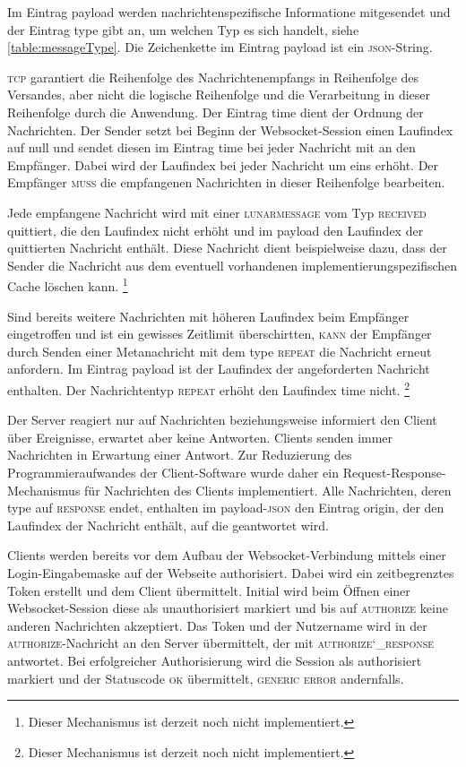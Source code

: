 \documentclass[ngerman,11pt]{report}
\begin{document}
Im Eintrag payload werden nachrichtenspezifische Informatione mitgesendet und der Eintrag
type gibt an, um welchen Typ es sich handelt, siehe \ref{table:messageType}. Die Zeichenkette
im Eintrag payload ist ein \textsc{json}-String.

\textsc{tcp} garantiert die Reihenfolge des Nachrichtenempfangs in Reihenfolge des Versandes,
aber nicht die logische Reihenfolge und die Verarbeitung in dieser Reihenfolge durch die
Anwendung. Der Eintrag time dient der Ordnung der Nachrichten. Der Sender setzt bei Beginn
der Websocket-Session einen Laufindex auf null und sendet diesen im Eintrag time bei jeder
Nachricht mit an den Empfänger. Dabei wird der Laufindex bei jeder Nachricht um eins erhöht.
Der Empfänger \textsc{muss} die empfangenen Nachrichten in dieser Reihenfolge bearbeiten.

Jede empfangene Nachricht wird mit einer \textsc{lunarmessage} vom Typ \textsc{received} quittiert,
die den Laufindex nicht erhöht und im payload den Laufindex der quittierten Nachricht enthält.
Diese Nachricht dient beispielweise dazu, dass der Sender die Nachricht aus dem eventuell vorhandenen
implementierungspezifischen Cache löschen kann.
\footnote{Dieser Mechanismus ist derzeit noch nicht implementiert.}

Sind bereits weitere Nachrichten mit höheren Laufindex beim Empfänger eingetroffen und ist ein gewisses
Zeitlimit überschirtten, \textsc{kann} der Empfänger durch Senden einer Metanachricht mit dem
type \textsc{repeat} die Nachricht erneut anfordern. Im Eintrag payload ist der Laufindex der
angeforderten Nachricht enthalten. Der Nachrichtentyp \textsc{repeat} erhöht den Laufindex time nicht.
\footnote{Dieser Mechanismus ist derzeit noch nicht implementiert.}

Der Server reagiert nur auf Nachrichten beziehungsweise informiert den Client über Ereignisse,
erwartet aber keine Antworten. Clients senden immer Nachrichten in Erwartung einer Antwort.
Zur Reduzierung des Programmieraufwandes der Client-Software wurde daher ein
Request-Response-Mechanismus für Nachrichten des Clients implementiert. Alle Nachrichten, deren
type auf \textsc{response} endet, enthalten im payload-\textsc{json} den Eintrag origin, der
den Laufindex der Nachricht enthält, auf die geantwortet wird.

Clients werden bereits vor dem Aufbau der Websocket-Verbindung mittels einer Login-Eingabemaske
auf der Webseite authorisiert. Dabei wird ein zeitbegrenztes Token erstellt und dem Client
übermittelt. Initial wird beim Öffnen einer Websocket-Session diese als unauthorisiert markiert
und bis auf \textsc{authorize} keine anderen Nachrichten akzeptiert. Das Token und der Nutzername wird in
der \textsc{authorize}-Nachricht an den Server übermittelt, der mit \textsc{authorize\char`_response} antwortet.
Bei erfolgreicher Authorisierung wird die Session als authorisiert markiert und der Statuscode \textsc{ok}
übermittelt, \textsc{generic error} andernfalls.
\end{document}
